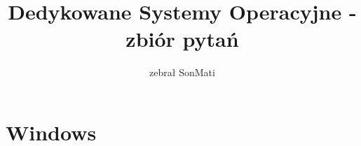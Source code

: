 \documentclass[a4paper,twoside]{article}
\newcommand{\Tak}[1] {
	\color{Gurin}{#1}
}
\newcommand{\Nie}[1] {
	\color{Red}{#1}
}
\newcommand{\question}[9] {
	\textbf{#1}
	\begin{enumerate}[a.]
		\ifnum\pdfstrcmp{#2}{Tak}=0
			\Tak{\item #3}
		\else
			\Nie{\item #3}
		\fi
		\color{black}
		\ifnum\pdfstrcmp{#4}{Tak}=0
			\Tak{\item #5}
		\else
			\Nie{\item #5}
		\fi
		\color{black}
		\ifnum\pdfstrcmp{#6}{Tak}=0
			\Tak{\item #7}
		\else
			\Nie{\item #7}
		\fi
		\color{black}
		\ifnum\pdfstrcmp{#8}{Tak}=0
			\Tak{\item #9}
		\else
			\Nie{\item #9}
		\fi
	\end{enumerate}
}
\begin{document}





\begin{titlepage}
\title{\huge Dedykowane Systemy Operacyjne - zbiór pytań}
\author{\large zebrał SonMati}
\maketitle
\end{titlepage}

\part{Windows}
\end{document}
